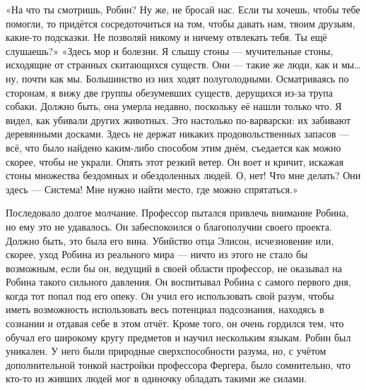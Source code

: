 \documentclass[a4paper,12pt]{book}
\begin{document}
	«На что ты смотришь, Робин? Ну же, не бросай нас. Если ты хочешь, чтобы тебе помогли, то придётся сосредоточиться на том, чтобы давать нам, твоим друзьям, какие-то подсказки. Не позволяй никому и ничему отвлекать тебя. Ты ещё слушаешь?»
	«Здесь мор и болезни. Я слышу стоны — мучительные стоны, исходящие от странных скитающихся существ. Они — такие же люди, как и мы… ну, почти как мы. Большинство из них ходят полуголодными. Осматриваясь по сторонам, я вижу две группы обезумевших существ, дерущихся из-за трупа собаки. Должно быть, она умерла недавно, поскольку её нашли только что. Я видел, как убивали других животных. Это настолько по-варварски: их забивают деревянными досками. Здесь не держат никаких продовольственных запасов — всё, что было найдено каким-либо способом этим днём, съедается как можно скорее, чтобы не украли. Опять этот резкий ветер. Он воет и кричит, искажая стоны множества бездомных и обездоленных людей. О, нет! Что мне делать? Они здесь — Система! Мне нужно найти место, где можно спрятаться.»

	Последовало долгое молчание. Профессор пытался привлечь внимание Робина, но ему это не удавалось. Он забеспокоился о благополучии своего проекта. Должно быть, это была его вина. Убийство отца Элисон, исчезновение или, скорее, уход Робина из реального мира — ничто из этого не стало бы возможным, если бы он, ведущий в своей области профессор, не оказывал на Робина такого сильного давления. Он воспитывал Робина с самого первого дня, когда тот попал под его опеку. Он учил его использовать свой разум, чтобы иметь возможность использовать весь потенциал подсознания, находясь в сознании и отдавая себе в этом отчёт. Кроме того, он очень гордился тем, что обучал его широкому кругу предметов и научил нескольким языкам. Робин был уникален. У него были природные сверхспособности разума, но, с учётом дополнительной тонкой настройки профессора Фергера, было сомнительно, что кто-то из живших людей мог в одиночку обладать такими же силами.
\end{document}
